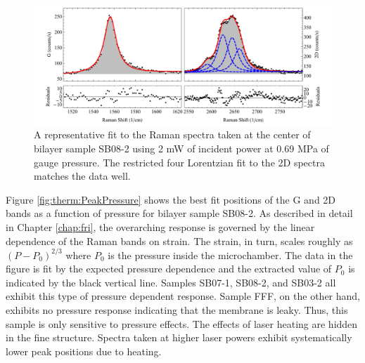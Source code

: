 \begin{figure}
	\begin{center}
	\includegraphics[scale=0.6]{Figs_Thermal/0_3mW.pdf}
	\end{center}
	\caption[Representative fit to Raman spectra for thermal conductivity measurements]{\label{fig:therm:spec}
		A representative fit to the Raman spectra taken at the center of bilayer sample SB08-2 using 2 mW of incident power at 0.69 MPa of gauge pressure.
		The restricted four Lorentzian fit to the 2D spectra matches the data well.
	}
\end{figure}

Figure \ref{fig:therm:PeakPressure} shows the best fit positions of the G and 2D bands as a function of pressure for bilayer sample SB08-2.
As described in detail in Chapter \ref{chap:fri}, the overarching response is governed by the linear dependence of the Raman bands on strain.
The strain, in turn, scales roughly as $(P-P_0)^{2/3}$ where $P_0$ is the pressure inside the microchamber.
The data in the figure is fit by the expected pressure dependence and the extracted value of $P_0$ is indicated by the black vertical line.
Samples SB07-1, SB08-2, and SB03-2 all exhibit this type of pressure dependent response.
Sample FFF, on the other hand, exhibits no pressure response indicating that the membrane is leaky.
Thus, this sample is only sensitive to pressure effects.
The effects of laser heating are hidden in the fine structure.
Spectra taken at higher laser powers exhibit systematically lower peak positions due to heating.

